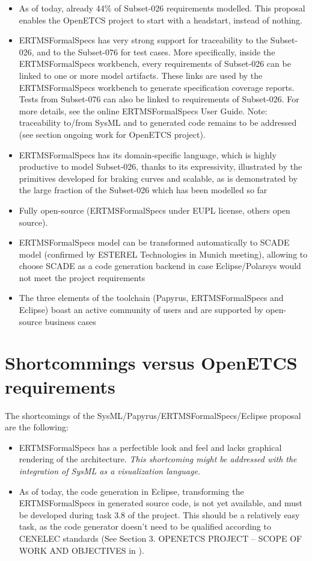 \begin{itemize}
	\item As of today, already 44\% of Subset-026 requirements modelled. This proposal enables the OpenETCS project to start with a headstart, instead of nothing.
	\item ERTMSFormalSpecs has very strong support for traceability to the Subset-026, and to the Subset-076 for test cases. More specifically, inside the ERTMSFormalSpecs workbench, every requirements of Subset-026 can be linked to one or more model artifacts. These links are used by the ERTMSFormalSpecs workbench to generate specification coverage reports. Tests from Subset-076 can also be linked to requirements of Subset-026. For more details, see the online ERTMSFormalSpecs User Guide.  Note: traceability to/from SysML and to generated code remains to be addressed (see section ongoing work for OpenETCS project).
	\item ERTMSFormalSpecs has its domain-specific language, which is highly productive to model Subset-026, thanks to its expressivity, illustrated by the primitives
developed for braking curves and scalable, as is demonstrated by the large fraction of the Subset-026 which has been modelled so far
	\item Fully open-source (ERTMSFormalSpecs under EUPL license, others open source). 
	\item ERTMSFormalSpecs model can be transformed automatically to SCADE model (confirmed by ESTEREL Technologies in Munich meeting), allowing to choose SCADE as a code generation backend in case Eclipse/Polarsys would not meet the project requirements
	\item The three elements of the toolchain (Papyrus, ERTMSFormalSpecs and Eclipse) boast an active community of users and are supported by open-source business cases
\end{itemize}

\section{Shortcommings versus OpenETCS requirements}

The shortcomings of the SysML/Papyrus/ERTMSFormalSpecs/Eclipse proposal are the following:

\begin{itemize}
	\item ERTMSFormalSpecs has a perfectible look and feel and lacks graphical rendering of the architecture. \emph{This shortcoming might be addressed with the integration of SysML as a visualization language.}
	\item As of today, the code generation in Eclipse, transforming the ERTMSFormalSpecs in generated source code, is not yet available, and must be developed during task 3.8 of the project. This should be a relatively easy task, as the code generator doesn't need to be qualified according to CENELEC standards (See Section 3. OPENETCS PROJECT – SCOPE OF WORK AND OBJECTIVES in \citep{WP3_WP4_WP7_SafetyMeetingMinutes_April2013}).
\end{itemize}

